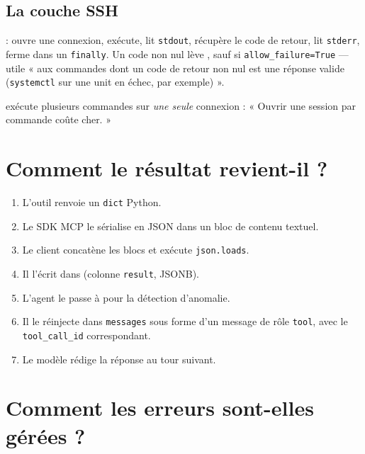 \subsection*{La couche SSH}
 : ouvre une connexion, exécute,
lit \texttt{stdout}, récupère le code de retour, lit \texttt{stderr}, ferme
dans un \texttt{finally}. Un code non nul lève , sauf si
\texttt{allow\_failure=True} --- utile « aux commandes dont un code de retour non
nul est une réponse valide (\texttt{systemctl} sur une unit en échec, par
exemple) ».

\noindent
{} exécute plusieurs commandes sur \emph{une seule}
connexion : « Ouvrir une session par commande coûte cher. »

\section{Comment le résultat revient-il ?}

\begin{enumerate}
  \item L'outil renvoie un \texttt{dict} Python.
  \item Le SDK MCP le sérialise en JSON dans un bloc de contenu textuel.
  \item Le client concatène les blocs et exécute \texttt{json.loads}.
  \item Il l'écrit dans  (colonne \texttt{result}, JSONB).
  \item L'agent le passe à  pour la détection
  d'anomalie.
  \item Il le réinjecte dans \texttt{messages} sous forme d'un message de rôle
  \texttt{tool}, avec le \texttt{tool\_call\_id} correspondant.
  \item Le modèle rédige la réponse au tour suivant.
\end{enumerate}

\section{Comment les erreurs sont-elles gérées ?}

